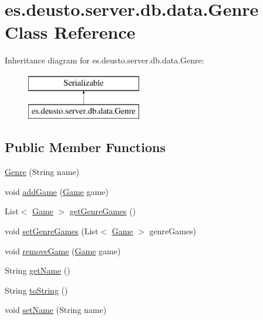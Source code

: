 \hypertarget{classes_1_1deusto_1_1server_1_1db_1_1data_1_1_genre}{}\section{es.\+deusto.\+server.\+db.\+data.\+Genre Class Reference}
\label{classes_1_1deusto_1_1server_1_1db_1_1data_1_1_genre}
Inheritance diagram for es.\+deusto.\+server.\+db.\+data.\+Genre\+:\begin{figure}[H]
\begin{center}
\leavevmode
\includegraphics[height=2.000000cm]{classes_1_1deusto_1_1server_1_1db_1_1data_1_1_genre}
\end{center}
\end{figure}
\subsection*{Public Member Functions}
\begin{DoxyCompactItemize}
\item 
\hyperlink{classes_1_1deusto_1_1server_1_1db_1_1data_1_1_genre_a1fa29d6819400738c473a923bf03cbff}{Genre} (String name)
\item 
void \hyperlink{classes_1_1deusto_1_1server_1_1db_1_1data_1_1_genre_a268b33c42da6c59b6688db28822e2369}{add\+Game} (\hyperlink{classes_1_1deusto_1_1server_1_1db_1_1data_1_1_game}{Game} game)
\item 
List$<$ \hyperlink{classes_1_1deusto_1_1server_1_1db_1_1data_1_1_game}{Game} $>$ \hyperlink{classes_1_1deusto_1_1server_1_1db_1_1data_1_1_genre_a5059b2831c8155be18ed98a43d36de83}{get\+Genre\+Games} ()
\item 
void \hyperlink{classes_1_1deusto_1_1server_1_1db_1_1data_1_1_genre_a05616f4c15dc04ae0d0136483bfc1c83}{set\+Genre\+Games} (List$<$ \hyperlink{classes_1_1deusto_1_1server_1_1db_1_1data_1_1_game}{Game} $>$ genre\+Games)
\item 
void \hyperlink{classes_1_1deusto_1_1server_1_1db_1_1data_1_1_genre_a3a966947f0780a4e312140b95022710d}{remove\+Game} (\hyperlink{classes_1_1deusto_1_1server_1_1db_1_1data_1_1_game}{Game} game)
\item 
String \hyperlink{classes_1_1deusto_1_1server_1_1db_1_1data_1_1_genre_a9a68a612e2209b224801f1f7e0e9dcc9}{get\+Name} ()
\item 
String \hyperlink{classes_1_1deusto_1_1server_1_1db_1_1data_1_1_genre_aeff531adb16e15f04a2f1a11b2b44af4}{to\+String} ()
\item 
void \hyperlink{classes_1_1deusto_1_1server_1_1db_1_1data_1_1_genre_a7e2273804775882fc0d73ba9dea2e3fc}{set\+Name} (String name)
\end{DoxyCompactItemize}



